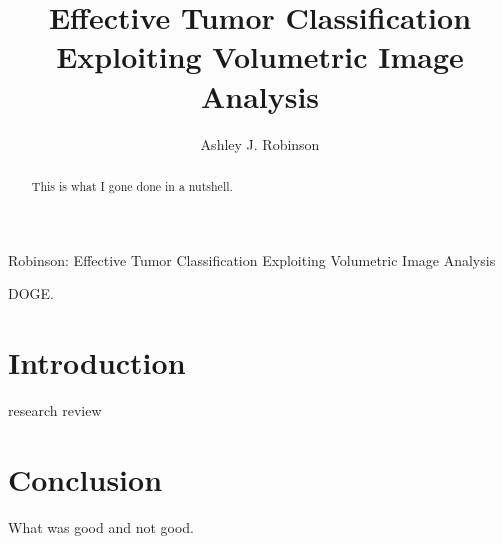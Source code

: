 \documentclass[journal]{IEEEtran}
\begin{document}
\title{Effective Tumor Classification Exploiting Volumetric Image Analysis}
\author{Ashley J. Robinson}

%
{Robinson: Effective Tumor Classification Exploiting Volumetric Image Analysis}

\maketitle


\begin{abstract}

This is what I gone done in a nutshell.

\end{abstract}







\begin{IEEEkeywords}
DOGE.

\end{IEEEkeywords}



\IEEEpeerreviewmaketitle



\section{Introduction}
 research review 


\section{Conclusion}

What was good and not good.
\end{document}

